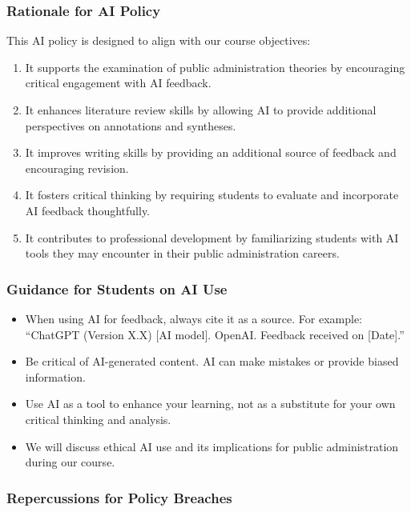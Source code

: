 \documentclass[11pt, letterpaper]{article}
\begin{document}
\subsubsection*{Rationale for AI Policy}

This AI policy is designed to align with our course objectives:

\begin{enumerate}
    \item It supports the examination of public administration theories by encouraging critical engagement with AI feedback.
    \item It enhances literature review skills by allowing AI to provide additional perspectives on annotations and syntheses.
    \item It improves writing skills by providing an additional source of feedback and encouraging revision.
    \item It fosters critical thinking by requiring students to evaluate and incorporate AI feedback thoughtfully.
    \item It contributes to professional development by familiarizing students with AI tools they may encounter in their public administration careers.
\end{enumerate}

\subsubsection*{Guidance for Students on AI Use}

\begin{itemize}
    \item When using AI for feedback, always cite it as a source. For example: ``ChatGPT (Version X.X) [AI model]. OpenAI. Feedback received on [Date].''
    \item Be critical of AI-generated content. AI can make mistakes or provide biased information.
    \item Use AI as a tool to enhance your learning, not as a substitute for your own critical thinking and analysis.
    \item We will discuss ethical AI use and its implications for public administration during our course.
\end{itemize}

\subsubsection*{Repercussions for Policy Breaches}
\end{document}
